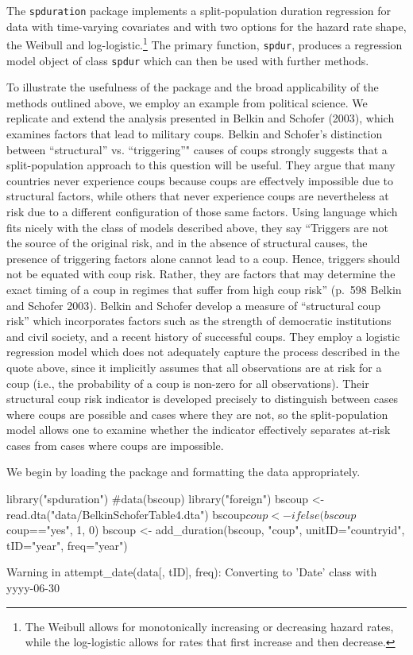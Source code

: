 \documentclass[article]{jss}
\begin{document}
The \texttt{spduration} package implements a split-population duration
regression for data with time-varying covariates and with two options
for the hazard rate shape, the Weibull and
log-logistic.\footnote{The Weibull allows for monotonically increasing or decreasing hazard rates, while the log-logistic allows for rates that first increase and then decrease.}
The primary function, \texttt{spdur}, produces a regression model object
of class \texttt{spdur} which can then be used with further methods.

To illustrate the usefulness of the package and the broad applicability
of the methods outlined above, we employ an example from political
science. We replicate and extend the analysis presented in Belkin and
Schofer (2003), which examines factors that lead to military coups.
Belkin and Schofer's distinction between ``structural'' vs.
``triggering''" causes of coups strongly suggests that a
split-population approach to this question will be useful. They argue
that many countries never experience coups because coups are effectvely
impossible due to structural factors, while others that never experience
coups are nevertheless at risk due to a different configuration of those
same factors. Using language which fits nicely with the class of models
described above, they say ``Triggers are not the source of the original
risk, and in the absence of structural causes, the presence of
triggering factors alone cannot lead to a coup. Hence, triggers should
not be equated with coup risk. Rather, they are factors that may
determine the exact timing of a coup in regimes that suffer from high
coup risk'' (p.~598 Belkin and Schofer 2003). Belkin and Schofer develop
a measure of ``structural coup risk'' which incorporates factors such as
the strength of democratic institutions and civil society, and a recent
history of successful coups. They employ a logistic regression model
which does not adequately capture the process described in the quote
above, since it implicitly assumes that all observations are at risk for
a coup (i.e., the probability of a coup is non-zero for all
observations). Their structural coup risk indicator is developed
precisely to distinguish between cases where coups are possible and
cases where they are not, so the split-population model allows one to
examine whether the indicator effectively separates at-risk cases from
cases where coups are impossible.

We begin by loading the package and formatting the data appropriately.

\begin{CodeChunk}
\begin{CodeInput}
library("spduration")
#data(bscoup)
library("foreign")
bscoup <- read.dta("data/BelkinSchoferTable4.dta")
bscoup$coup <- ifelse(bscoup$coup=="yes", 1, 0)
bscoup      <- add_duration(bscoup, "coup", unitID="countryid", tID="year",
                            freq="year")
\end{CodeInput}
\begin{CodeOutput}
Warning in attempt_date(data[, tID], freq): Converting to 'Date' class with
yyyy-06-30
\end{CodeOutput}
\end{CodeChunk}
\end{document}
